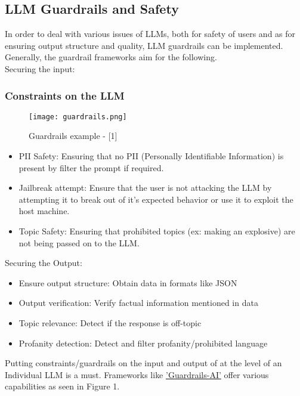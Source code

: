 \documentclass[12pt]{article}
\begin{document}
    \subsection{LLM Guardrails and Safety}

    In order to deal with various issues of LLMs, both for safety of users and as for ensuring output structure and quality, LLM guardrails can be implemented. Generally, the guardrail frameworks aim for the following.\\
    Securing the input:

    \subsubsection{Constraints on the LLM}
    \begin{figure}[ht!]
        \texttt{[image: guardrails.png]}
        \caption{Guardrails example - [1]}
        \label{fig:guardrails}
    \end{figure}
    \begin{itemize}
        \item PII Safety: Ensuring that no PII (Personally Identifiable Information) is present by filter the prompt if required.
        \item Jailbreak attempt: Ensure that the user is not attacking the LLM by attempting it to break out of it's expected behavior or use it to exploit the host machine.
        \item Topic Safety: Ensuring that prohibited topics (ex: making an explosive) are not being passed on to the LLM.
    \end{itemize}
    Securing the Output:
    \begin{itemize}
        \item Ensure output structure: Obtain data in formats like JSON
        \item Output verification: Verify factual information mentioned in data
        \item Topic relevance: Detect if the response is off-topic
        \item Profanity detection: Detect and filter profanity/prohibited language
    \end{itemize}

    Putting constraints/guardrails on the input and output of at the level of an Individual LLM is a must. Frameworks like \href{https://github.com/guardrails-ai/guardrails}{'Guardrails-AI'} offer various capabilities as seen in Figure 1.
\end{document}
